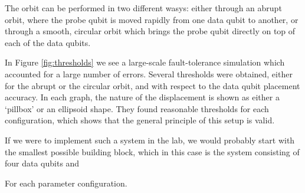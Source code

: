 The orbit can be performed in two different wasys: either through an abrupt orbit, where the probe qubit is moved rapidly from one data qubit to another, or through a smooth, circular orbit which brings the probe qubit directly on top of each of the data qubits. 

In Figure \ref{fig:thresholds} we see a large-scale fault-tolerance simulation which accounted for a large number of errors. Several thresholds were obtained, either for the abrupt or the circular orbit, and with respect to the data qubit placement accuracy. In each graph, the nature of the displacement is shown as either a `pillbox' or an ellipsoid shape. They found reasonable thresholds for each configuration, which shows that the general principle of this setup is valid. 

If we were to implement such a system in the lab, we would probably start with the smallest possible building block, which in this case is the system consisting of four data qubits and 

For each parameter configuration. 
